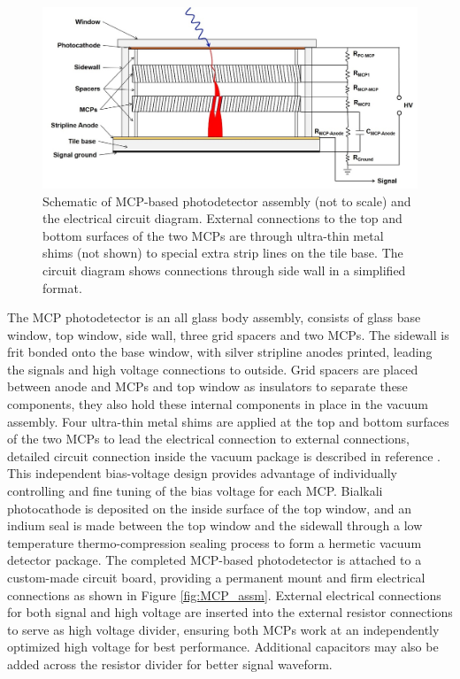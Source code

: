 \documentclass[preprint,5p]{elsarticle}
\begin{document}
\begin{figure}[tbp]
\centering 
\includegraphics[scale=0.21]{fig/MCPs_design.png}
\caption{Schematic of MCP-based photodetector assembly (not to scale) and the 
   electrical circuit diagram. External connections to the top and bottom 
surfaces of the two MCPs are through ultra-thin metal shims (not shown) to 
special extra strip lines on the tile base. The circuit diagram shows 
connections through side wall in a simplified format.} 
\label{fig:design}
\end{figure}

The MCP photodetector is an all glass body assembly, consists of glass base 
window, top window, side wall, three grid spacers and two MCPs. The sidewall is 
frit bonded onto the base window, with silver stripline anodes printed, leading 
the signals and high voltage connections to outside. Grid spacers are placed 
between anode and MCPs and top window as insulators to separate these 
components, they also hold these internal components in place in the vacuum 
assembly. Four ultra-thin metal shims are applied at the top and bottom 
surfaces of the two MCPs to lead the electrical connection to external 
connections, detailed circuit connection inside the vacuum package is described 
in reference \cite{Xia-MCPs}. This independent bias-voltage design provides 
advantage of individually controlling and fine tuning of the bias voltage for 
each MCP. Bialkali photocathode is deposited on the inside surface of the top 
window, and an indium seal is made between the top window and the sidewall 
through a low temperature thermo-compression sealing process to form a hermetic 
vacuum detector package. The completed MCP-based photodetector is attached to a 
custom-made circuit board, providing a permanent mount and firm electrical 
connections as shown in Figure \ref{fig:MCP_assm}. External electrical 
connections for both signal and high voltage are inserted into the external 
resistor connections to serve as high voltage divider, ensuring both MCPs work 
at an independently optimized high voltage for best performance.  Additional 
capacitors may also be added across the resistor divider for better signal 
waveform.  
\end{document}
